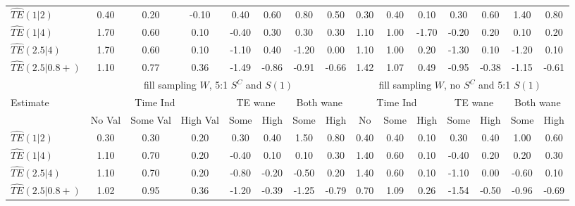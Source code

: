 \documentclass[times, 11pt]{article}
\begin{document}
\begin{table} [H]
\begin{tabular}{l|ccc|cc|cc|ccc|cc|cc}
\hline
$\widehat{TE}(1|2)$&0.40 & 0.20 & -0.10 & 0.40 & 0.60 & 0.80 & 0.50 & 0.30 & 0.40 & 0.10 & 0.30 & 0.60 & 1.40 & 0.80 \\
$\widehat{TE}(1|4)$&1.70 & 0.60 & 0.10 & -0.40 & 0.30 & 0.30 & 0.30 & 1.10 & 1.00 & -1.70 & -0.20 & 0.20 & 0.10 & 0.20 \\
$\widehat{TE}(2.5|4)$&1.70 & 0.60 & 0.10 & -1.10 & 0.40 & -1.20 & 0.00 & 1.10 & 1.00 & 0.20 & -1.30 & 0.10 & -1.20 & 0.10 \\ 
$\widehat{TE}(2.5|0.8+)$& 1.10 & 0.77 & 0.36 & -1.49 & -0.86 & -0.91 & -0.66 & 1.42 & 1.07 & 0.49 & -0.95 & -0.38 & -1.15 & -0.61 \\ 
\hline
\hline
&\multicolumn{7}{c}{fill sampling $W$, 5:1 $S^{C}$ and $S(1)$} &\multicolumn{7}{c}{fill sampling $W$, no $S^{C}$ and 5:1 $S(1)$}\\
Estimate&\multicolumn{3}{|c}{Time Ind}&\multicolumn{2}{|c}{TE wane}&\multicolumn{2}{|c}{Both wane}&\multicolumn{3}{|c}{Time Ind}&\multicolumn{2}{|c}{TE wane}&\multicolumn{2}{|c}{Both wane}\\
&No Val&Some Val&High Val&Some&High&Some&High&No&Some&High&Some&High&Some&High\\
\hline
$\widehat{TE}(1|2)$& 0.30 & 0.30 & 0.20 & 0.30 & 0.40 & 1.50 & 0.80 & 0.40 & 0.40 & 0.10 & 0.30 & 0.40 & 1.00 & 0.60 \\
$\widehat{TE}(1|4)$& 1.10 & 0.70 & 0.20 & -0.40 & 0.10 & 0.10 & 0.30 & 1.40 & 0.60 & 0.10 & -0.40 & 0.20 & 0.20 & 0.30 \\  
$\widehat{TE}(2.5|4)$& 1.10 & 0.70 & 0.20 & -0.80 & -0.20 & -0.50 & 0.20 & 1.40 & 0.60 & 0.10 & -1.10 & 0.00 & -0.60 & 0.10 \\ 
$\widehat{TE}(2.5|0.8+)$& 1.02 & 0.95 & 0.36 & -1.20 & -0.39 & -1.25 & -0.79 & 0.70 & 1.09 & 0.26 & -1.54 & -0.50 & -0.96 & -0.69 \\ 
\hline
\end{tabular} 
\end{table}
\end{document}
